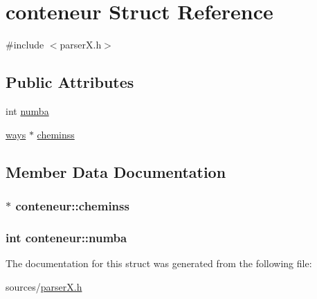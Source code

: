 \hypertarget{structconteneur}{\section{conteneur Struct Reference}
\label{structconteneur}
}


{\ttfamily \#include $<$parser\-X.\-h$>$}

\subsection*{Public Attributes}
\begin{DoxyCompactItemize}
\item 
int \hyperlink{structconteneur_a4585f3cd5ceb9f57bc66932b6345cd71}{numba}
\item 
\hyperlink{structways}{ways} $\ast$ \hyperlink{structconteneur_a59a7b3feff97bbf6b0c7bb9e47a6d4f9}{cheminss}
\end{DoxyCompactItemize}


\subsection{Member Data Documentation}
\hypertarget{structconteneur_a59a7b3feff97bbf6b0c7bb9e47a6d4f9}{
\subsubsection[{cheminss}]{$\ast$ conteneur\-::cheminss}}\label{structconteneur_a59a7b3feff97bbf6b0c7bb9e47a6d4f9}
\hypertarget{structconteneur_a4585f3cd5ceb9f57bc66932b6345cd71}{
\subsubsection[{numba}]{\setlength{\rightskip}{0pt plus 5cm}int conteneur\-::numba}}\label{structconteneur_a4585f3cd5ceb9f57bc66932b6345cd71}


The documentation for this struct was generated from the following file\-:\begin{DoxyCompactItemize}
\item 
sources/\hyperlink{parser_x_8h}{parser\-X.\-h}\end{DoxyCompactItemize}
